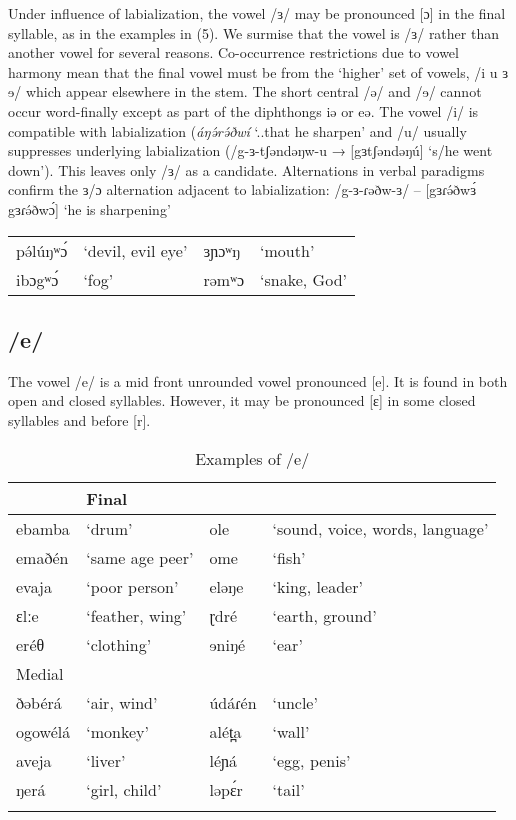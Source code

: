 Under influence of labialization, the vowel /ɜ/ may be pronounced [ɔ] in the final syllable, as in the examples in (5). We surmise that the vowel is /ɜ/ rather than another vowel for several reasons. Co-occurrence restrictions due to vowel harmony mean that the final vowel must be from the ‘higher’ set of vowels, /i u ɜ ɘ/ which appear elsewhere in the stem. The short central /ə/ and /ɘ/ cannot occur word-finally except as part of the diphthongs iə or eə. The vowel /i/ is compatible with labialization (\textit{áŋə́rə́ðwí} ‘..that he sharpen’ and /u/ usually suppresses underlying labialization (/g-ɜ-tʃəndəŋw-u → [gɜtʃəndəŋú] ‘s/he went down’). This leaves only /ɜ/ as a candidate. Alternations in verbal paradigms confirm the ɜ/ɔ alternation adjacent to labialization: /g-ɜ-ɾəðw-ɜ/ --  [gɜɾə́ðwɜ́ ~  gɜɾə́ðwɔ́] ‘he is sharpening’

\ea \begin{tabular}[t]{llll}
pə́lúŋʷɔ́	& ‘devil, evil eye’ & 	ɜɲɔʷŋ	& ‘mouth’\\
ibɔgʷɔ́	& ‘fog’	& rəmʷɔ & 	‘snake, God’ 	\\
 \end{tabular} \label{ex:ch2:1}
\z


\subsection{/e/}

The vowel /e/ is a mid front unrounded vowel pronounced [e]. It is found in both open and closed syllables. However, it may be pronounced [ɛ] in some closed syllables and before [r].

\begin{table}
\caption{Examples of /e/}
 \label{tab:ch2:6}
\begin{tabular}[t]{lp{3.2cm}lp{5cm}}
 \lsptoprule
\multicolumn{2}{l}{Initial} &	\multicolumn{2}{l}{Final}  \\
\midrule
ebamba	&	‘drum’			&	ole	&	‘sound, voice, words, language’\\
emaðén	&	‘same age peer’ 	&	ome	&	‘fish’\\
evaja	&	‘poor person’		&	eləŋe&	‘king, leader’\\
ɛlːe		&	‘feather, wing’		&	ɽdré&	‘earth, ground’\\
eréθ	&	‘clothing’			&	ɘniŋé&	‘ear’\\
\midrule
 \multicolumn{2}{l}{Medial} & & \\
 \midrule		
ðəbérá	&	‘air, wind’		&	údáɾén&	‘uncle’\\
ogowélá	&	‘monkey’			&	alét̪a	&	‘wall’\\
aveja	&	‘liver’			&	léɲá	&	‘egg, penis’\\
ŋerá	&	‘girl, child’		&	ləpɛ́r	&	‘tail’\\
\lspbottomrule
\end{tabular}
\end{table}


